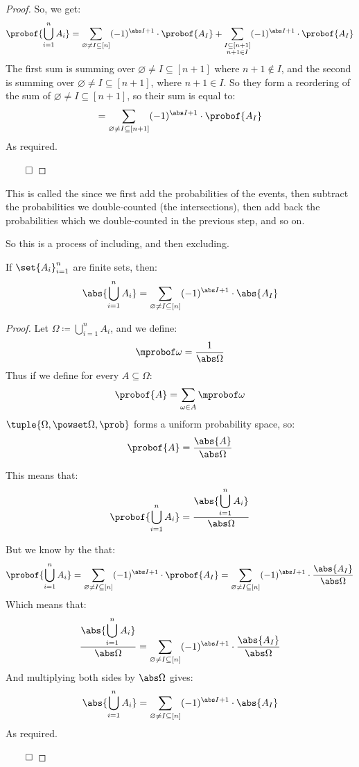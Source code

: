 \begin{proof}
	So, we get:
	\[ \probof{\bigcup_{i=1}^n A_i} = \sum_{\varnothing\neq I\subseteq[n]}(-1)^{\abs I+1}\cdot\probof{A_I} +
	   \sum_{\substack{I\subseteq[n+1]\\n+1\in I}}(-1)^{\abs I+1}\cdot\probof{A_I} \]
	The first sum is summing over $\varnothing\neq I\subseteq[n+1]$ where $n+1\notin I$, and the second is
	summing over $\varnothing\neq I\subseteq[n+1]$, where $n+1\in I$.
	So they form a reordering of the sum of $\varnothing\neq I\subseteq[n+1]$, so their sum is equal to:
	\[ = \sum_{\varnothing\neq I\subseteq[n+1]}(-1)^{\abs I+1}\cdot\probof{A_I} \]
	As required.

\hfill$\qed$

\end{proof}

\begin{note}

	This is called the  since we first add the probabilities of the events,
	then subtract the probabilities we double-counted (the intersections), then add back the probabilities which
	we double-counted in the previous step, and so on.

	So this is a process of including, and then excluding.

\end{note}

\begin{coro*}

	If $\set{A_i}_{i=1}^n$ are finite sets, then:
	\[ \abs{\bigcup_{i=1}^n A_i} = \sum_{\varnothing\neq I\subseteq[n]}(-1)^{\abs I+1}\cdot\abs{A_I} \]

\end{coro*}

\begin{proof}

	Let $\Omega\coloneqq\bigcup\limits_{i=1}^n A_i$, and we define:
	\[ \mprobof\omega = \frac{1}{\abs\Omega} \]
	Thus if we define for every $A\subseteq\Omega$:
	\[ \probof{A} = \sum_{\omega\in A}\mprobof\omega \]
	$\tuple{\Omega, \powset\Omega, \prob}$ forms a uniform probability space, so:
	\[ \probof{A} = \frac{\abs{A}}{\abs\Omega} \]

	This means that:
	\[ \probof{\bigcup_{i=1}^n A_i} = \frac{\displaystyle\abs{\bigcup_{i=1}^n A_i}}{\abs\Omega} \]

	But we know by the  that:
	\[ \probof{\bigcup_{i=1}^n A_i} = \sum_{\varnothing\neq I\subseteq[n]}(-1)^{\abs I+1}\cdot\probof{A_I} 
	=  \sum_{\varnothing\neq I\subseteq[n]}(-1)^{\abs I+1}\cdot\frac{\abs{A_I}}{\abs\Omega} \]
	Which means that:
	\[ \frac{\displaystyle\abs{\bigcup_{i=1}^n A_i}}{\abs\Omega} =
	   \sum_{\varnothing\neq I\subseteq[n]}(-1)^{\abs I+1}\cdot\frac{\abs{A_I}}{\abs\Omega} \]
	And multiplying both sides by $\abs\Omega$ gives:
	\[ \abs{\bigcup_{i=1}^n A_i} = \sum_{\varnothing\neq I\subseteq[n]}(-1)^{\abs I+1}\cdot\abs{A_I} \]
	As required.

\hfill$\qed$

\end{proof}

